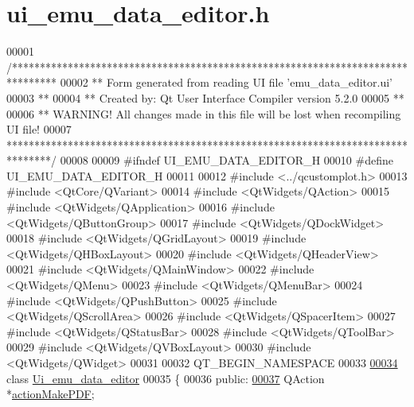 \hypertarget{a00138_source}{\section{ui\+\_\+emu\+\_\+data\+\_\+editor.\+h}
\label{a00138_source}
}

\begin{DoxyCode}
00001 \textcolor{comment}{/********************************************************************************}
00002 \textcolor{comment}{** Form generated from reading UI file 'emu\_data\_editor.ui'}
00003 \textcolor{comment}{**}
00004 \textcolor{comment}{** Created by: Qt User Interface Compiler version 5.2.0}
00005 \textcolor{comment}{**}
00006 \textcolor{comment}{** WARNING! All changes made in this file will be lost when recompiling UI file!}
00007 \textcolor{comment}{********************************************************************************/}
00008 
00009 \textcolor{preprocessor}{#ifndef UI\_EMU\_DATA\_EDITOR\_H}
00010 \textcolor{preprocessor}{#define UI\_EMU\_DATA\_EDITOR\_H}
00011 
00012 \textcolor{preprocessor}{#include <../qcustomplot.h>}
00013 \textcolor{preprocessor}{#include <QtCore/QVariant>}
00014 \textcolor{preprocessor}{#include <QtWidgets/QAction>}
00015 \textcolor{preprocessor}{#include <QtWidgets/QApplication>}
00016 \textcolor{preprocessor}{#include <QtWidgets/QButtonGroup>}
00017 \textcolor{preprocessor}{#include <QtWidgets/QDockWidget>}
00018 \textcolor{preprocessor}{#include <QtWidgets/QGridLayout>}
00019 \textcolor{preprocessor}{#include <QtWidgets/QHBoxLayout>}
00020 \textcolor{preprocessor}{#include <QtWidgets/QHeaderView>}
00021 \textcolor{preprocessor}{#include <QtWidgets/QMainWindow>}
00022 \textcolor{preprocessor}{#include <QtWidgets/QMenu>}
00023 \textcolor{preprocessor}{#include <QtWidgets/QMenuBar>}
00024 \textcolor{preprocessor}{#include <QtWidgets/QPushButton>}
00025 \textcolor{preprocessor}{#include <QtWidgets/QScrollArea>}
00026 \textcolor{preprocessor}{#include <QtWidgets/QSpacerItem>}
00027 \textcolor{preprocessor}{#include <QtWidgets/QStatusBar>}
00028 \textcolor{preprocessor}{#include <QtWidgets/QToolBar>}
00029 \textcolor{preprocessor}{#include <QtWidgets/QVBoxLayout>}
00030 \textcolor{preprocessor}{#include <QtWidgets/QWidget>}
00031 
00032 QT\_BEGIN\_NAMESPACE
00033 
\hypertarget{a00138_source_l00034}{}\hyperlink{a00079}{00034} \textcolor{keyword}{class }\hyperlink{a00079}{Ui\_emu\_data\_editor}
00035 \{
00036 \textcolor{keyword}{public}:
\hypertarget{a00138_source_l00037}{}\hyperlink{a00079_af013c084ff0ed9ae39a60aa7a39bdd91}{00037}     QAction *\hyperlink{a00079_af013c084ff0ed9ae39a60aa7a39bdd91}{actionMakePDF};

\end{DoxyCode}
